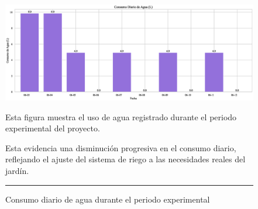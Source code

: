 \documentclass[pdflatex,sn-mathphys-num]{sn-jnl}%
\theoremstyle{thmstyleone}%
\theoremstyle{thmstyletwo}%
\theoremstyle{thmstylethree}%
\begin{document}
\begin{figure}[!ht]
    \centering
    \includegraphics[width=1\textwidth]{assets/consumo_diario_barras.eps}

    \caption{Consumo diario de agua durante el periodo experimental}
    \label{fig:consumo}

    \vspace{0.4cm}

    \noindent
    \begin{minipage}[t]{0.48\textwidth}

    \raggedright
    Esta figura muestra el uso de agua registrado durante el periodo experimental del proyecto.
\end{minipage}
\hfill
\begin{minipage}[t]{0.48\textwidth}
    \justifying
   Esta evidencia una disminución progresiva en el consumo diario, reflejando el ajuste del sistema de riego a las necesidades reales del jardín.
\end{minipage}


    \vspace{0.5cm}
    \hrule
\end{figure}
\end{document}
